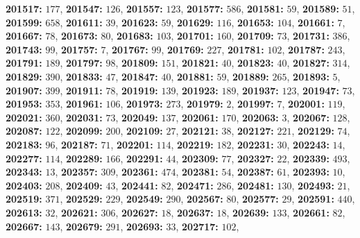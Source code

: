 \textsf{\bfseries 201517:} $177$, \textsf{\bfseries 201547:} $126$, \textsf{\bfseries 201557:} $123$, \textsf{\bfseries 201577:} $586$, \textsf{\bfseries 201581:} $59$, \textsf{\bfseries 201589:} $51$, \textsf{\bfseries 201599:} $658$, \textsf{\bfseries 201611:} $39$, \textsf{\bfseries 201623:} $59$, \textsf{\bfseries 201629:} $116$, \textsf{\bfseries 201653:} $104$, \textsf{\bfseries 201661:} $7$, \textsf{\bfseries 201667:} $78$, \textsf{\bfseries 201673:} $80$, \textsf{\bfseries 201683:} $103$, \textsf{\bfseries 201701:} $160$, \textsf{\bfseries 201709:} $73$, \textsf{\bfseries 201731:} $386$, \textsf{\bfseries 201743:} $99$, \textsf{\bfseries 201757:} $7$, \textsf{\bfseries 201767:} $99$, \textsf{\bfseries 201769:} $227$, \textsf{\bfseries 201781:} $102$, \textsf{\bfseries 201787:} $243$, \textsf{\bfseries 201791:} $189$, \textsf{\bfseries 201797:} $98$, \textsf{\bfseries 201809:} $151$, \textsf{\bfseries 201821:} $40$, \textsf{\bfseries 201823:} $40$, \textsf{\bfseries 201827:} $314$, \textsf{\bfseries 201829:} $390$, \textsf{\bfseries 201833:} $47$, \textsf{\bfseries 201847:} $40$, \textsf{\bfseries 201881:} $59$, \textsf{\bfseries 201889:} $265$, \textsf{\bfseries 201893:} $5$, \textsf{\bfseries 201907:} $399$, \textsf{\bfseries 201911:} $78$, \textsf{\bfseries 201919:} $139$, \textsf{\bfseries 201923:} $189$, \textsf{\bfseries 201937:} $123$, \textsf{\bfseries 201947:} $73$, \textsf{\bfseries 201953:} $353$, \textsf{\bfseries 201961:} $106$, \textsf{\bfseries 201973:} $273$, \textsf{\bfseries 201979:} $2$, \textsf{\bfseries 201997:} $7$, \textsf{\bfseries 202001:} $119$, \textsf{\bfseries 202021:} $360$, \textsf{\bfseries 202031:} $73$, \textsf{\bfseries 202049:} $137$, \textsf{\bfseries 202061:} $170$, \textsf{\bfseries 202063:} $3$, \textsf{\bfseries 202067:} $128$, \textsf{\bfseries 202087:} $122$, \textsf{\bfseries 202099:} $200$, \textsf{\bfseries 202109:} $27$, \textsf{\bfseries 202121:} $38$, \textsf{\bfseries 202127:} $221$, \textsf{\bfseries 202129:} $74$, \textsf{\bfseries 202183:} $96$, \textsf{\bfseries 202187:} $71$, \textsf{\bfseries 202201:} $114$, \textsf{\bfseries 202219:} $182$, \textsf{\bfseries 202231:} $30$, \textsf{\bfseries 202243:} $14$, \textsf{\bfseries 202277:} $114$, \textsf{\bfseries 202289:} $166$, \textsf{\bfseries 202291:} $44$, \textsf{\bfseries 202309:} $77$, \textsf{\bfseries 202327:} $22$, \textsf{\bfseries 202339:} $493$, \textsf{\bfseries 202343:} $13$, \textsf{\bfseries 202357:} $309$, \textsf{\bfseries 202361:} $474$, \textsf{\bfseries 202381:} $54$, \textsf{\bfseries 202387:} $61$, \textsf{\bfseries 202393:} $10$, \textsf{\bfseries 202403:} $208$, \textsf{\bfseries 202409:} $43$, \textsf{\bfseries 202441:} $82$, \textsf{\bfseries 202471:} $286$, \textsf{\bfseries 202481:} $130$, \textsf{\bfseries 202493:} $21$, \textsf{\bfseries 202519:} $371$, \textsf{\bfseries 202529:} $229$, \textsf{\bfseries 202549:} $290$, \textsf{\bfseries 202567:} $80$, \textsf{\bfseries 202577:} $29$, \textsf{\bfseries 202591:} $440$, \textsf{\bfseries 202613:} $32$, \textsf{\bfseries 202621:} $306$, \textsf{\bfseries 202627:} $18$, \textsf{\bfseries 202637:} $18$, \textsf{\bfseries 202639:} $133$, \textsf{\bfseries 202661:} $82$, \textsf{\bfseries 202667:} $143$, \textsf{\bfseries 202679:} $291$, \textsf{\bfseries 202693:} $33$, \textsf{\bfseries 202717:} $102$, 
